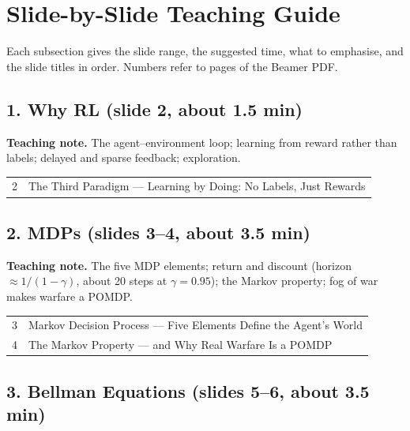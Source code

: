 \documentclass[11pt]{article}
\begin{document}
\section{Slide-by-Slide Teaching Guide}

Each subsection gives the slide range, the suggested time, what to emphasise, and the slide titles in order. Numbers refer to pages of the Beamer PDF.

\subsection{1. Why RL \normalfont\small\color{GreyN}(slide 2, about 1.5 min)}

\textbf{Teaching note.} The agent--environment loop; learning from reward rather than labels; delayed and sparse feedback; exploration.

\begin{center}\small\renewcommand{\arraystretch}{1.1}\begin{tabularx}{\textwidth}{@{}r X@{}}2 & The Third Paradigm --- Learning by Doing: No Labels, Just Rewards\\\end{tabularx}\end{center}

\subsection{2. MDPs \normalfont\small\color{GreyN}(slides 3--4, about 3.5 min)}

\textbf{Teaching note.} The five MDP elements; return and discount (horizon $\approx1/(1-\gamma)$, about 20 steps at $\gamma=0.95$); the Markov property; fog of war makes warfare a POMDP.

\begin{center}\small\renewcommand{\arraystretch}{1.1}\begin{tabularx}{\textwidth}{@{}r X@{}}3 & Markov Decision Process --- Five Elements Define the Agent's World\\
4 & The Markov Property --- and Why Real Warfare Is a POMDP\\\end{tabularx}\end{center}

\subsection{3. Bellman Equations \normalfont\small\color{GreyN}(slides 5--6, about 3.5 min)}
\end{document}

